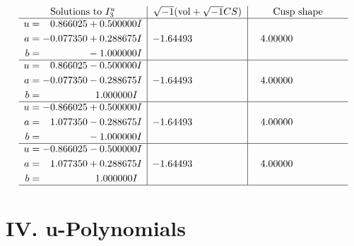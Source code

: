 \documentclass[1p]{elsarticle_modified}
\theoremstyle{definition}
\newcommand{\I}{\sqrt{-1}}
\begin{document}
$$\begin{array}{c|c|c}  
\text{Solutions to }I^u_{3}& \I (\text{vol} + \sqrt{-1}CS) & \text{Cusp shape}\\
 \hline 
\begin{aligned}
u &= \phantom{-}0.866025 + 0.500000 I \\
a &= -0.077350 + 0.288675 I \\
b &= \phantom{-0.000000 } -1.000000 I\end{aligned}
 & -1.64493\phantom{ +0.000000I} & \phantom{-}4.00000\phantom{ +0.000000I} \\ \hline\begin{aligned}
u &= \phantom{-}0.866025 - 0.500000 I \\
a &= -0.077350 - 0.288675 I \\
b &= \phantom{-0.000000 -}1.000000 I\end{aligned}
 & -1.64493\phantom{ +0.000000I} & \phantom{-}4.00000\phantom{ +0.000000I} \\ \hline\begin{aligned}
u &= -0.866025 + 0.500000 I \\
a &= \phantom{-}1.077350 - 0.288675 I \\
b &= \phantom{-0.000000 } -1.000000 I\end{aligned}
 & -1.64493\phantom{ +0.000000I} & \phantom{-}4.00000\phantom{ +0.000000I} \\ \hline\begin{aligned}
u &= -0.866025 - 0.500000 I \\
a &= \phantom{-}1.077350 + 0.288675 I \\
b &= \phantom{-0.000000 -}1.000000 I\end{aligned}
 & -1.64493\phantom{ +0.000000I} & \phantom{-}4.00000\phantom{ +0.000000I}\\
 \hline 
 \end{array}$$\newpage
\newpage\renewcommand{\arraystretch}{1}
\centering \section*{ IV. u-Polynomials}
\end{document}
